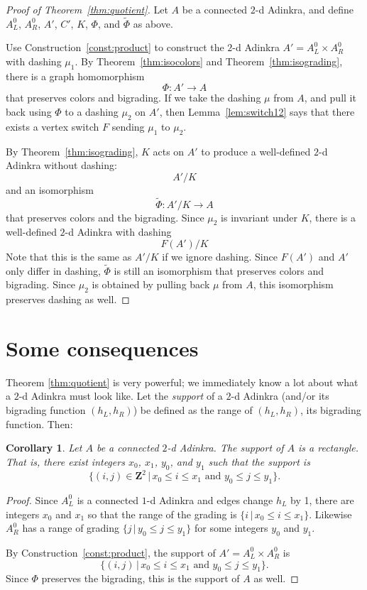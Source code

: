 \documentclass[12pt,twoside,singlespace]{article}
\numberwithin{equation}{section}
\newtheorem{cor}[equation]{Corollary}
\theoremstyle{definition}
\newcommand{\ZZ}{\mathbf{Z}}
\begin{document}
\begin{proof}[Proof of Theorem~\ref{thm:quotient}]
Let $A$ be a connected $2$-d Adinkra, and define $A_L^0$, $A_R^0$, $A'$, $C'$, $K$, $\Phi$, and $\tilde{\Phi}$ as above.

Use Construction~\ref{const:product} to construct the $2$-d Adinkra $A'=A_L^0\times A_R^0$ with dashing $\mu_1$.
By Theorem~\ref{thm:isocolors} and Theorem~\ref{thm:isograding}, there is a graph homomorphism
\[\Phi:A' \to A\]
that preserves colors and bigrading.  If we take the dashing $\mu$ from $A$, and pull it back using $\Phi$ to a dashing $\mu_2$ on $A'$, then Lemma~\ref{lem:switch12} says that there exists a vertex switch $F$ sending $\mu_1$ to $\mu_2$.

By Theorem~\ref{thm:isograding}, $K$ acts on $A'$ to produce a well-defined $2$-d Adinkra without dashing:
\[A'/K\]
and an isomorphism
\[\tilde{\Phi}:A'/K\to A\]
that preserves colors and the bigrading.  Since $\mu_2$ is invariant under $K$, there is a well-defined $2$-d Adinkra with dashing
\[F(A')/K\]
Note that this is the same as $A'/K$ if we ignore dashing.  Since $F(A')$ and $A'$ only differ in dashing, $\tilde{\Phi}$ is still an isomorphism that preserves colors and bigrading.  Since $\mu_2$ is obtained by pulling back $\mu$ from $A$, this isomorphism preserves dashing as well.
\end{proof}

\section{Some consequences}

Theorem \ref{thm:quotient} is very powerful; we immediately know a lot about what a $2$-d Adinkra must look like. Let the \emph{support} of a $2$-d Adinkra (and/or its bigrading function $(h_L,h_R)$) be defined as the range of $(h_L,h_R)$, its bigrading function. Then:
\begin{cor}
\label{cor:rectangle}
Let $A$ be a connected $2$-d Adinkra.  The support of $A$ is a rectangle.  That is, there exist integers $x_0$, $x_1$, $y_0$, and $y_1$ such that the support is
\[\{(i,j)\in\ZZ^2\,|\,x_0 \le i\le x_1\mbox{ and }y_0\le j\le y_1\}.\]
\end{cor}
\begin{proof}
Since $A_L^0$ is a connected $1$-d Adinkra and edges change $h_L$ by 1, there are integers $x_0$ and $x_1$ so that the range of the grading is $\{i\,|\,x_0\le i\le x_1\}$.  Likewise $A_R^0$ has a range of grading $\{j\,|\,y_0\le j\le y_1\}$ for some integers $y_0$ and $y_1$.

By Construction~\ref{const:product}, the support of $A'=A_L^0\times A_R^0$ is
\[\{(i,j)\,|\,x_0\le i\le x_1\mbox{ and }y_0\le j\le y_1\}.\]
Since $\Phi$ preserves the bigrading, this is the support of $A$ as well.
\end{proof}
\end{document}
